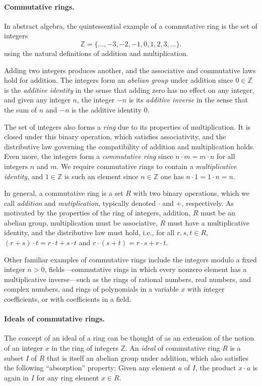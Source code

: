 \documentclass{article}
\begin{document}
\paragraph{Commutative rings.}
In abstract algebra, the quintessential example of a commutative ring is the set of integers
\[\mathbb{Z} = \{ \ldots, -3, -2, -1, 0, 1, 2, 3, \ldots \}.\]
using the natural definitions of addition and multiplication.  

Adding two integers produces another, and the associative and commutative laws hold for addition.  The integers form an \emph{abelian group} under addition since $0 \in \mathbb{Z}$ is the \emph{additive identity} in the sense that adding zero has no effect on any integer, and given any integer $n$, the integer $-n$ is its \emph{additive inverse} in the sense that the sum of $n$ and $-n$ is the additive identity $0$. 

The set of integers also forms a \emph{ring} due to its properties of multiplication.  
It is closed under this binary operation, which satisfies associativity, and the distributive law governing the compatibility of addition and multiplication holds. 
Even more, the integers form a \emph{commutative ring} 
 since $n \cdot m = m \cdot n$ for all integers $n$ and $m$.  We require commutative rings to contain a \emph{multiplicative identity}, and $1 \in \mathbb{Z}$ is such an element since 
   $n \in \mathbb{Z}$ one has $n \cdot 1 = 1 \cdot n = n$. 

In general, a commutative ring is a set $R$ with two binary operations, which we call \emph{addition} and \emph{mutiplication}, typically denoted $\cdot$ and $+$, respectively.  As motivated by the properties of the ring of integers, addition, $R$ must be an abelian group, multiplication must be associative, $R$ must have a multiplicative identity, and the distributive law must hold, i.e., for all $r, s, t \in R$, $(r+s)\cdot t = r \cdot t + s \cdot t$ and $r \cdot (s+t) = r \cdot s + r \cdot t$.   

Other familiar examples of commutative rings include the integers modulo a fixed integer $n>0$, fields---commutative rings in which every nonzero element has a multiplicative inverse---such as the rings of rational numbers, real numbers, and complex numbers, and rings of polynomials in a variable $x$ with integer coefficients, or with coefficients in a field.


\paragraph{Ideals of commutative rings.}
The concept of an {ideal} of a ring can be thought of as an extension of the notion of an integer $x$ in the ring of integers $\mathbb{Z}$. 
An \emph{ideal} of commutative ring $R$ is a subset $I$ of $R$ that is itself 
an abelian group under addition,  
which also satisfies the following ``absorption'' property: Given any element $a$ of $I$, 
the product  $x \cdot a$ is again in $I$ for any ring element $x \in R$. 
\end{document}
